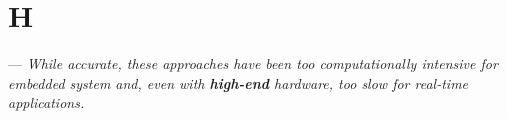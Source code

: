 \section{H}

 --- \textit{While accurate, these approaches have been too computationally intensive for embedded system and, even with \textbf{high-end} hardware, too slow for real-time applications.}
